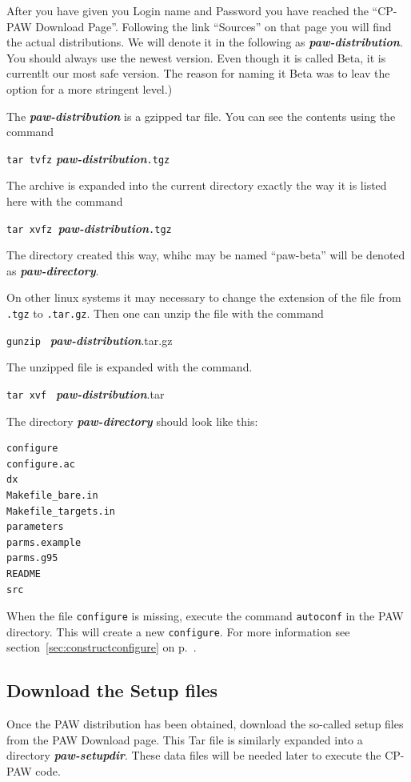 \documentclass[a4paper,10pt]{report}
\newcommand{\myspec}[1]{\textbf{\textit{#1}}}
\newcommand{\mytt}[1]{{\tt #1}}
\begin{document}
After you have given you Login name and Password you have reached the
``CP-PAW Download Page''. Following the link ``Sources'' on that page
you will find the actual distributions. We will denote it in the
following as \myspec{paw-distribution}. You
should always use the newest version. Even though it is called Beta,
it is currentlt our most safe version. The reason for naming it Beta
was to leav the option for a more stringent level.)

The \myspec{paw-distribution} is a gzipped tar file. You can see the
contents using the command
\begin{center} 
\mytt{tar tvfz} \myspec{paw-distribution}\mytt{.tgz}
\end{center}
The archive is expanded into the current directory exactly the way it
is listed here with the command
\begin{center}
\mytt{tar xvfz }\myspec{paw-distribution}\mytt{.tgz}
\end{center}
The directory created this way, whihc may be named ``paw-beta'' will
be denoted as \myspec{paw-directory}.


On other linux systems it may necessary to change the extension of the
file from \mytt{.tgz} to \mytt{.tar.gz}. Then one can unzip the file
with the command
\begin{center}
\mytt{gunzip } \myspec{paw-distribution}.tar.gz
\end{center}
The unzipped file is expanded with the command.
\begin{center}
\mytt{tar xvf } \myspec{paw-distribution}.tar
\end{center}

The directory \myspec{paw-directory} should look like this:
\begin{verbatim}
configure
configure.ac
dx
Makefile_bare.in
Makefile_targets.in
parameters
parms.example
parms.g95
README
src
\end{verbatim}

When the file \verb|configure| is missing, execute the command
\verb|autoconf| in the PAW directory. This will create a new
\verb|configure|. For more information see
section~\ref{sec:constructconfigure} on
p.~\pageref{sec:constructconfigure}.


\subsection{Download the Setup files}
Once the PAW distribution has been obtained, download the so-called
setup files from the PAW Download page. This Tar file is similarly
expanded into a directory \myspec{paw-setupdir}. These data files will
be needed later to execute the CP-PAW code.
\end{document}
